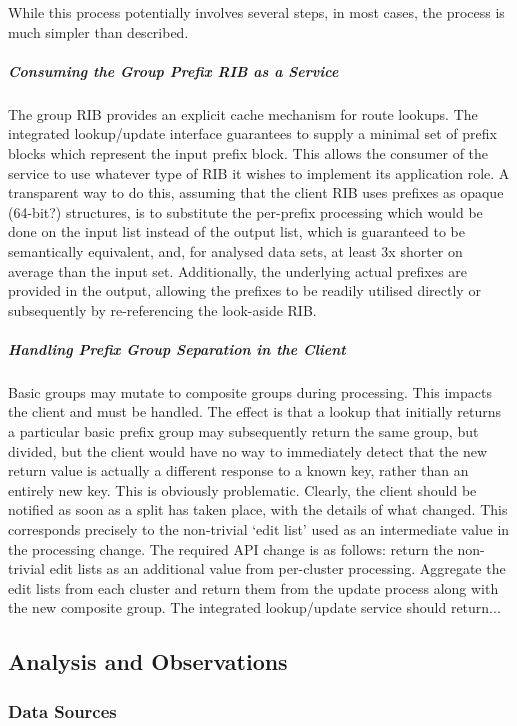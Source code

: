 While this process potentially involves several steps, in most cases, the process is much simpler than described.

\subparagraph{Consuming the Group Prefix RIB as a Service}

The group RIB provides an explicit cache mechanism for route lookups. The integrated lookup/update interface guarantees to supply a minimal set of prefix blocks which represent the input prefix block. This allows the consumer of the service to use whatever type of RIB it wishes to implement its application role. A transparent way to do this, assuming that the client RIB uses prefixes as opaque (64-bit?) structures, is to substitute the per-prefix processing which would be done on the input list instead of the output list, which is guaranteed to be semantically equivalent, and, for analysed data sets, at least 3x shorter on average than the input set. Additionally, the underlying actual prefixes are provided in the output, allowing the prefixes to be readily utilised directly or subsequently by re-referencing the look-aside RIB.

\subparagraph{Handling Prefix Group Separation in the Client}

Basic groups may mutate to composite groups during processing. This impacts the client and must be handled. The effect is that a lookup that initially returns a particular basic prefix group may subsequently return the same group, but divided, but the client would have no way to immediately detect that the new return value is actually a different response to a known key, rather than an entirely new key. This is obviously problematic. Clearly, the client should be notified as soon as a split has taken place, with the details of what changed. This corresponds precisely to the non-trivial `edit list' used as an intermediate value in the processing change. The required API change is as follows: return the non-trivial edit lists as an additional value from per-cluster processing. Aggregate the edit lists from each cluster and return them from the update process along with the new composite group. The integrated lookup/update service should return...

\subsection{Analysis and Observations}

\subsubsection{Data Sources}

